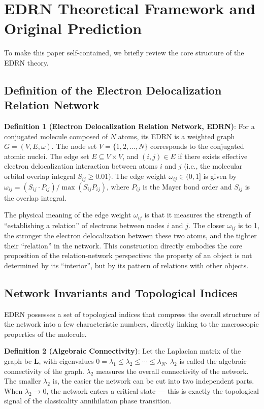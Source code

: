 \documentclass[prb,reprint,twocolumn,superscriptaddress]{revtex4-2}
\begin{document}
\section{EDRN Theoretical Framework and Original Prediction}\label{sec:EDRN}

To make this paper self-contained, we briefly review the core structure of the EDRN theory.

\subsection{Definition of the Electron Delocalization Relation Network}

\textbf{Definition 1 (Electron Delocalization Relation Network, EDRN)}: For a conjugated molecule composed of $N$ atoms, its EDRN is a weighted graph $G = (V, E, \omega)$. The node set $V = \{1, 2, \ldots, N\}$ corresponds to the conjugated atomic nuclei. The edge set $E \subseteq V \times V$, and $(i, j) \in E$ if there exists effective electron delocalization interaction between atoms $i$ and $j$ (i.e., the molecular orbital overlap integral $S_{ij} \geq 0.01$). The edge weight $\omega_{ij} \in (0, 1]$ is given by $\omega_{ij} = (S_{ij} \cdot P_{ij}) / \max(S_{ij}P_{ij})$, where $P_{ij}$ is the Mayer bond order and $S_{ij}$ is the overlap integral.

The physical meaning of the edge weight $\omega_{ij}$ is that it measures the strength of ``establishing a relation'' of electrons between nodes $i$ and $j$. The closer $\omega_{ij}$ is to 1, the stronger the electron delocalization between these two atoms, and the tighter their ``relation'' in the network. This construction directly embodies the core proposition of the relation-network perspective: the property of an object is not determined by its ``interior'', but by its pattern of relations with other objects.

\subsection{Network Invariants and Topological Indices}

EDRN possesses a set of topological indices that compress the overall structure of the network into a few characteristic numbers, directly linking to the macroscopic properties of the molecule.

\textbf{Definition 2 (Algebraic Connectivity)}: Let the Laplacian matrix of the graph be $\bm{L}$, with eigenvalues $0 = \lambda_1 \leq \lambda_2 \leq \cdots \leq \lambda_N$. $\lambda_2$ is called the algebraic connectivity of the graph. $\lambda_2$ measures the overall connectivity of the network. The smaller $\lambda_2$ is, the easier the network can be cut into two independent parts. When $\lambda_2 \to 0$, the network enters a critical state --- this is exactly the topological signal of the classicality annihilation phase transition.
\end{document}
